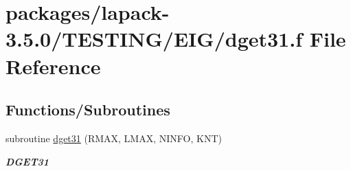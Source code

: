 \hypertarget{dget31_8f}{}\section{packages/lapack-\/3.5.0/\+T\+E\+S\+T\+I\+N\+G/\+E\+I\+G/dget31.f File Reference}
\label{dget31_8f}
\subsection*{Functions/\+Subroutines}
\begin{DoxyCompactItemize}
\item 
subroutine \hyperlink{group__double__eig_gaec96be19f30761456f6973cfbfe302bb}{dget31} (R\+M\+A\+X, L\+M\+A\+X, N\+I\+N\+F\+O, K\+N\+T)
\begin{DoxyCompactList}\small\item\em {\bfseries D\+G\+E\+T31} \end{DoxyCompactList}\end{DoxyCompactItemize}
